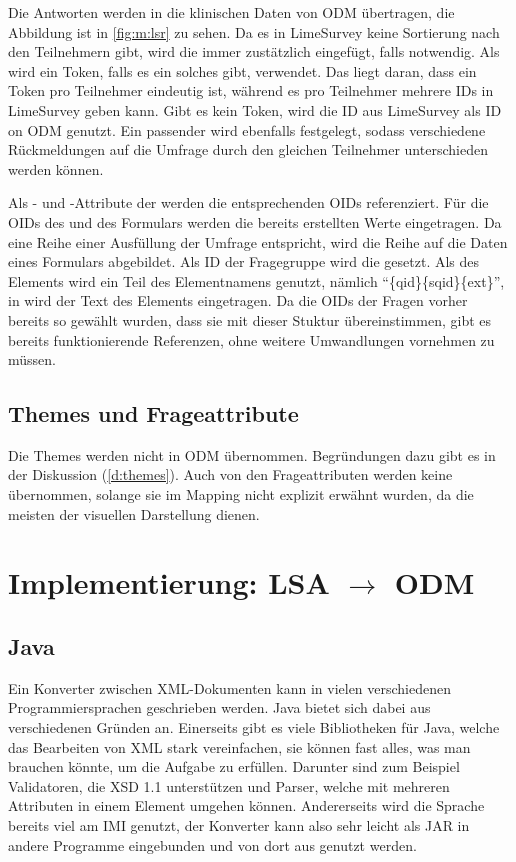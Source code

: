 Die Antworten werden in die klinischen Daten von ODM übertragen, die Abbildung ist in \cref{fig:m:lsr} zu sehen.
Da es in LimeSurvey keine Sortierung nach den Teilnehmern gibt, wird die  immer zustätzlich eingefügt, falls notwendig.
Als  wird ein Token, falls es ein solches gibt, verwendet. Das liegt daran, dass ein Token pro Teilnehmer eindeutig ist, während es pro Teilnehmer mehrere IDs in LimeSurvey geben kann.
Gibt es kein Token, wird die ID aus LimeSurvey als ID on ODM genutzt.
Ein passender  wird ebenfalls festgelegt, sodass verschiedene Rückmeldungen auf die Umfrage durch den gleichen Teilnehmer unterschieden werden können.

Als - und -Attribute der  werden die entsprechenden OIDs referenziert.
Für die OIDs des  und des Formulars werden die bereits erstellten Werte eingetragen.
Da eine Reihe einer Ausfüllung der Umfrage entspricht, wird die Reihe auf die Daten eines Formulars abgebildet.
Als ID der Fragegruppe wird die  gesetzt.
Als  des  Elements wird ein Teil des Elementnamens genutzt, nämlich \enquote{\{qid\}\{sqid\}\{ext\}}, in  wird der Text des Elements eingetragen.
Da die OIDs der Fragen vorher bereits so gewählt wurden, dass sie mit dieser Stuktur übereinstimmen, gibt es bereits funktionierende Referenzen, ohne weitere Umwandlungen vornehmen zu müssen.

\subsection{Themes und Frageattribute}

Die Themes werden nicht in ODM übernommen. Begründungen dazu gibt es in der Diskussion (\cref{d:themes}).
Auch von den Frageattributen werden keine übernommen, solange sie im Mapping nicht explizit erwähnt wurden, da die meisten der visuellen Darstellung dienen.

\section{Implementierung: LSA $\rightarrow$ ODM}
\label{im:lsa2odm}

\subsection{Java}

Ein Konverter zwischen XML-Dokumenten kann in vielen verschiedenen Programmiersprachen geschrieben werden.
Java bietet sich dabei aus verschiedenen Gründen an.
Einerseits gibt es viele Bibliotheken für Java, welche das Bearbeiten von XML stark vereinfachen, sie können fast alles, was man brauchen könnte, um die Aufgabe zu erfüllen.
Darunter sind zum Beispiel Validatoren, die XSD 1.1 unterstützen und Parser, welche mit mehreren Attributen in einem Element umgehen können.
Andererseits wird die Sprache bereits viel am IMI genutzt, der Konverter kann also sehr leicht als JAR in andere Programme eingebunden und von dort aus genutzt werden.

